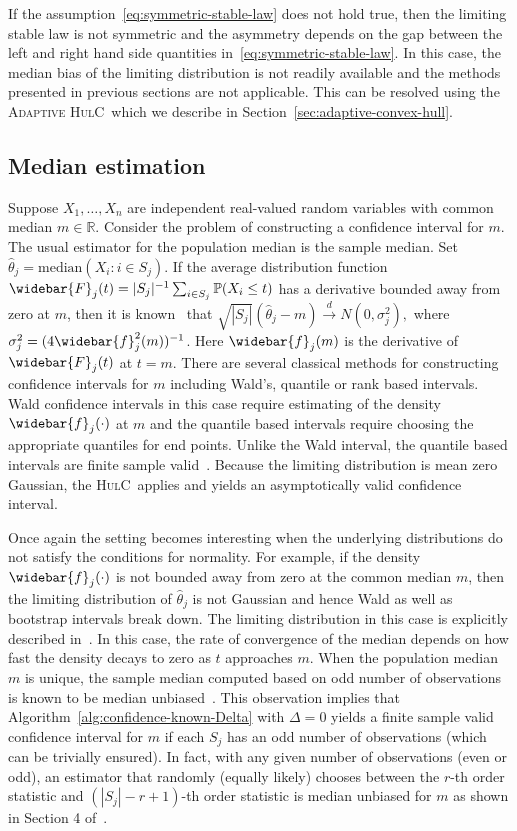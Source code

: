 \documentclass{article}
\newcommand{\hulc}{\textsc{HulC}~}
\newcommand{\ahulc}{\textsc{Adaptive HulC}~}
\numberwithin{myalgctr}{section}
\begin{document}
If the assumption~\eqref{eq:symmetric-stable-law} does not hold true, then the limiting stable law is not symmetric and the asymmetry depends on the gap between the left and right hand side quantities in~\eqref{eq:symmetric-stable-law}. In this case, the median bias of the limiting distribution is not readily available and the methods presented in previous sections are not applicable. This can be resolved using the \ahulc which we describe in Section~\ref{sec:adaptive-convex-hull}.
\subsection{Median estimation}
Suppose $X_1, \ldots, X_n$ are independent real-valued random variables with common median $m\in\mathbb{R}$. Consider the problem of constructing a confidence interval for $m$. The usual estimator for the population median is the sample median. Set $\widehat{\theta}_j = \mbox{median}(X_i: i\in S_j)$. If the average distribution function $\widebar{F}_j(t) = |S_j|^{-1}\sum_{i\in S_j}\mathbb{P}(X_i \le t)$ has a derivative bounded away from zero at $m$, then it is known~\citep{sen1968asymptotic} that
$\sqrt{|S_j|}(\widehat{\theta}_j - m) \overset{d}{\to} N(0, \sigma_j^2),$ where $\sigma_j^2 = (4\widebar{f}_j^2(m))^{-1}$.
Here $\widebar{f}_j(m)$ is the derivative of $\widebar{F}_j(t)$ at $t = m$. There are several classical methods for constructing confidence intervals for $m$ including Wald's, quantile or rank based intervals. Wald confidence intervals in this case require estimating of the density $\widebar{f}_j(\cdot)$ at $m$ and the quantile based intervals require choosing the appropriate quantiles for end points. Unlike the Wald interval, the quantile based intervals are finite sample valid~\citep{lanke1974interval}. Because the limiting distribution is mean zero Gaussian, the \hulc applies and yields an asymptotically valid confidence interval. 

Once again the setting becomes interesting when the underlying distributions do not satisfy the conditions for normality. For example, if the density $\widebar{f}_j(\cdot)$ is not bounded away from zero at the common median $m$, then the limiting distribution of $\widehat{\theta}_j$ is not Gaussian and hence Wald as well as bootstrap intervals break down. The limiting distribution in this case is explicitly described in~\citet[Section 2]{knight1998limiting}.
In this case, the rate of convergence of the median depends on how fast the density decays to zero as $t$ approaches $m$. When the population median $m$ is unique, the sample median computed based on odd number of observations is known to be median unbiased~\citep{mahamunulu1969estimation}. This observation implies that Algorithm~\ref{alg:confidence-known-Delta} with $\Delta = 0$ yields a finite sample valid confidence interval for $m$ if each $S_j$ has an odd number of observations (which can be trivially ensured). In fact, with any given number of observations (even or odd), an estimator that randomly (equally likely) chooses between the $r$-th order statistic and $(|S_j|-r+1)$-th order statistic is median unbiased for $m$ as shown in Section 4 of~\cite{mahamunulu1969estimation}. 
\end{document}
